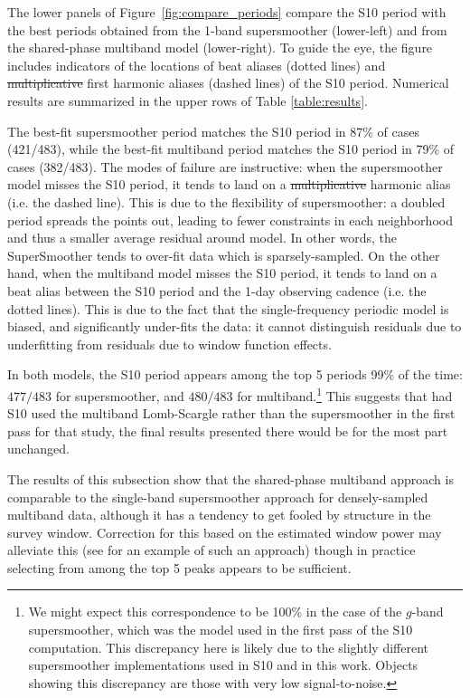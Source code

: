\documentclass{emulateapj}
\newcommand{\Fig}[1]{Figure~\ref{fig:#1}}
\newcommand{\fig}[1]{\Fig{#1}}
\newcommand{\new}[1]{{\color{red} #1}}
\newcommand{\old}[1]{{\sout{#1}}}
\begin{document}
The lower panels of \fig{compare_periods} compare the S10 period with the best periods obtained from the 1-band supersmoother (lower-left) and from the shared-phase multiband model (lower-right). To guide the eye, the figure includes indicators of the locations of beat aliases (dotted lines) and \old{multiplicative} \new{first harmonic} aliases (dashed lines) of the S10 period. \new{Numerical results are summarized in the upper rows of Table \ref{table:results}.}

The best-fit supersmoother period matches the S10 period in 87\% of cases (421/483), while the best-fit multiband period matches the S10 period in 79\% of cases (382/483). The modes of failure are instructive: when the supersmoother model misses the S10 period, it tends to land on a \old{multiplicative} \new{harmonic} alias (i.e. the dashed line). This is due to the flexibility of supersmoother: a doubled period spreads the points out, leading to fewer constraints in each neighborhood and thus a smaller average residual around model. In other words, the SuperSmoother tends to over-fit data which is sparsely-sampled. On the other hand, when the multiband model misses the S10 period, it tends to land on a beat alias between the S10 period and the 1-day observing cadence (i.e. the dotted lines). This is due to the fact that the single-frequency periodic model is biased, and significantly under-fits the data: it cannot distinguish residuals due to underfitting from residuals due to window function effects.

 In both models, the S10 period appears among the top 5 periods 99\% of the time: $477/483$ for supersmoother, and $480/483$ for multiband.\footnote{We might expect this correspondence to be 100\% in the case of the $g$-band supersmoother, which was the model used in the first pass of the S10 computation. This discrepancy here is likely due to the slightly different supersmoother implementations used in S10 and in this work. Objects showing this discrepancy are those with very low signal-to-noise.} This suggests that had S10 used the multiband Lomb-Scargle rather than the supersmoother in the first pass for that study, the final results presented there would be for the most part unchanged.

The results of this subsection show that the shared-phase multiband approach is comparable to the single-band supersmoother approach for densely-sampled multiband data, although it has a tendency to get fooled by structure in the survey window. Correction for this based on the estimated window power may alleviate this (see \citet{Roberts87} for an example of such an approach) though in practice selecting from among the top 5 peaks appears to be sufficient.
\end{document}
